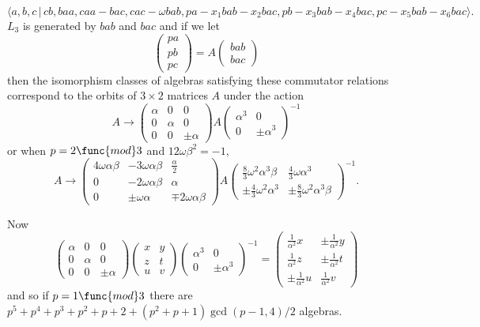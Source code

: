 \documentclass[10pt,thmsa]{article}
\begin{document}
\[
\langle a,b,c\,|\,cb,baa,caa-bac,cac-\omega
bab,pa-x_{1}bab-x_{2}bac,pb-x_{3}bab-x_{4}bac,pc-x_{5}bab-x_{6}bac\rangle . 
\]%
$L_{3}$ is generated by $bab$ and $bac$ and if we let 
\[
\left( 
\begin{array}{l}
pa \\ 
pb \\ 
pc%
\end{array}%
\right) =A\left( 
\begin{array}{l}
bab \\ 
bac%
\end{array}%
\right) 
\]%
then the isomorphism classes of algebras satisfying these commutator
relations correspond to the orbits of $3\times 2$ matrices $A$ under the
action 
\[
A\rightarrow \left( 
\begin{array}{lll}
\alpha & 0 & 0 \\ 
0 & \alpha & 0 \\ 
0 & 0 & \pm \alpha%
\end{array}%
\right) A\left( 
\begin{array}{ll}
\alpha ^{3} & 0 \\ 
0 & \pm \alpha ^{3}%
\end{array}%
\right) ^{-1} 
\]%
or when $p=2\func{mod}3$ and $12\omega \beta ^{2}=-1$, 
\[
A\rightarrow \left( 
\begin{array}{lll}
4\omega \alpha \beta & -3\omega \alpha \beta & \frac{\alpha }{2} \\ 
0 & -2\omega \alpha \beta & \alpha \\ 
0 & \pm \omega \alpha & \mp 2\omega \alpha \beta%
\end{array}%
\right) A\left( 
\begin{array}{ll}
\frac{8}{3}\omega ^{2}\alpha ^{3}\beta & \frac{4}{3}\omega \alpha ^{3} \\ 
\pm \frac{4}{3}\omega ^{2}\alpha ^{3} & \pm \frac{8}{3}\omega ^{2}\alpha
^{3}\beta%
\end{array}%
\right) ^{-1}. 
\]

Now 
\[
\left( 
\begin{array}{lll}
\alpha & 0 & 0 \\ 
0 & \alpha & 0 \\ 
0 & 0 & \pm \alpha%
\end{array}
\right) \left( 
\begin{array}{ll}
x & y \\ 
z & t \\ 
u & v%
\end{array}
\right) \left( 
\begin{array}{ll}
\alpha ^3 & 0 \\ 
0 & \pm \alpha ^3%
\end{array}
\right) ^{-1}=\allowbreak \left( 
\begin{array}{cc}
\frac 1{\alpha ^2}x & \pm \frac 1{\alpha ^2}y \\ 
\frac 1{\alpha ^2}z & \pm \frac 1{\alpha ^2}t \\ 
\pm \frac 1{\alpha ^2}u & \frac 1{\alpha ^2}v%
\end{array}
\right) 
\]
and so if $p=1\func{mod}3$ there are $p^5+p^4+p^3+p^2+p+2+(p^2+p+1)\gcd
(p-1,4)/2$ algebras.
\end{document}
